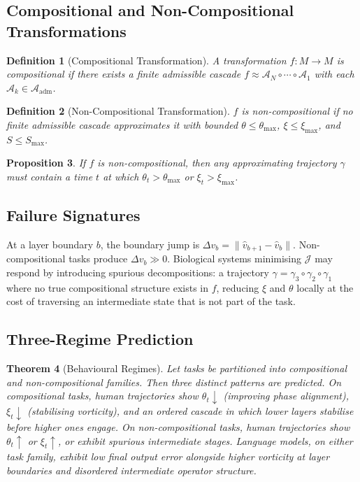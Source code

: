 \documentclass[12pt, a4paper]{article}
\newtheorem{theorem}{Theorem}[section]
\newtheorem{definition}[theorem]{Definition}
\newtheorem{proposition}[theorem]{Proposition}
\theoremstyle{remark}
\theoremstyle{definition}
\begin{document}
\subsection{Compositional and Non-Compositional Transformations}

\begin{definition}[Compositional Transformation]
A transformation $f\colon M \to M$ is compositional if there exists a finite admissible
cascade $f \approx \mathcal{A}_N \circ \cdots \circ \mathcal{A}_1$ with each
$\mathcal{A}_k \in \mathcal{A}_{\mathrm{adm}}$.
\end{definition}

\begin{definition}[Non-Compositional Transformation]
$f$ is non-compositional if no finite admissible cascade approximates it with bounded
$\theta \le \theta_{\max}$, $\xi \le \xi_{\max}$, and $S \le S_{\max}$.
\end{definition}

\begin{proposition}
If $f$ is non-compositional, then any approximating trajectory $\gamma$ must contain a
time $t$ at which $\theta_t > \theta_{\max}$ or $\xi_t > \xi_{\max}$.
\end{proposition}

\subsection{Failure Signatures}

At a layer boundary $b$, the boundary jump is $\Delta v_b = \|\hat{v}_{b+1} - \hat{v}_b\|$.
Non-compositional tasks produce $\Delta v_b \gg 0$.  Biological systems minimising
$\mathcal{J}$ may respond by introducing spurious decompositions: a trajectory
$\gamma = \gamma_3 \circ \gamma_2 \circ \gamma_1$ where no true compositional structure
exists in $f$, reducing $\xi$ and $\theta$ locally at the cost of traversing an
intermediate state that is not part of the task.

\subsection{Three-Regime Prediction}

\begin{theorem}[Behavioural Regimes]
\label{thm:regimes}
Let tasks be partitioned into compositional and non-compositional families.  Then three
distinct patterns are predicted.  On compositional tasks, human trajectories show
$\theta_t \downarrow$ (improving phase alignment), $\xi_t \downarrow$ (stabilising
vorticity), and an ordered cascade in which lower layers stabilise before higher ones
engage.  On non-compositional tasks, human trajectories show $\theta_t \uparrow$ or
$\xi_t \uparrow$, or exhibit spurious intermediate stages.  Language models, on either
task family, exhibit low final output error alongside higher vorticity at layer boundaries
and disordered intermediate operator structure.
\end{theorem}
\end{document}
